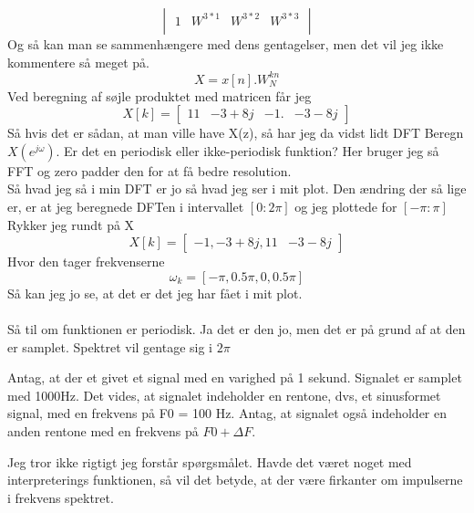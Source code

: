 \begin{EksamensOpgaver}
\begin{Eksamenssæt}[2021]
\begin{eksamensOpgave}
\begin{UnderOpgave}
\[\begin{vmatrix}
                    1 & W^{3 * 1} & W^{3 * 2} & W^{3*3} \\
                \end{vmatrix}\]
                Og så kan man se sammenhængere med dens gentagelser, men det vil jeg ikke kommentere så meget på.
                \[X = x[n].W_N^{kn}\]
                Ved beregning af søjle produktet med matricen får jeg
                \[X[k] = [\begin{array}{cccc} 11 & -3 + 8j & -1. & -3 -8j\end{array}]\]
                Så hvis det er sådan, at man ville have X(z), så har jeg da vidst lidt DFT
                Beregn $X(e^{j\omega})$. Er det en periodisk eller ikke-periodisk funktion?
                Her bruger jeg så FFT og zero padder den for at få bedre resolution.
                \\
                Så hvad jeg så i min DFT er jo så hvad jeg ser i mit plot. Den ændring der så lige er, er at jeg beregnede DFTen i intervallet $[0:2\pi]$ og jeg plottede for $[-\pi:\pi]$
                Rykker jeg rundt på X 
                \[X[k] = [\begin{array}{cccc} -1, -3 + 8j, 11 & -3 - 8j \end{array}]\]
                Hvor den tager frekvenserne 
                \[\omega_k = [-\pi, 0.5\pi, 0, 0.5\pi]\]
                Så kan jeg jo se, at det er det jeg har fået i mit plot. \\\\
                Så til om funktionen er periodisk. Ja det er den jo, men det er på grund af at den er samplet. Spektret vil gentage sig i $2\pi$
            \end{UnderOpgave}
        \end{eksamensOpgave}
        \begin{eksamensOpgave}
            Antag, at der et givet et signal med en varighed på 1 sekund. Signalet er samplet med 1000Hz. 
            Det vides, at signalet indeholder en rentone, dvs, et sinusformet signal, med en frekvens
            på F0 = 100 Hz. Antag, at signalet også indeholder en anden rentone med en frekvens på
            $F0 + \Delta F$. 
            \begin{UnderOpgave}
                Jeg tror ikke rigtigt jeg forstår spørgsmålet. Havde det været noget med interpreterings funktionen, 
                så vil det betyde, at der være firkanter om impulserne i frekvens spektret. 

\end{UnderOpgave}
\end{eksamensOpgave}
\end{Eksamenssæt}
\end{EksamensOpgaver}
